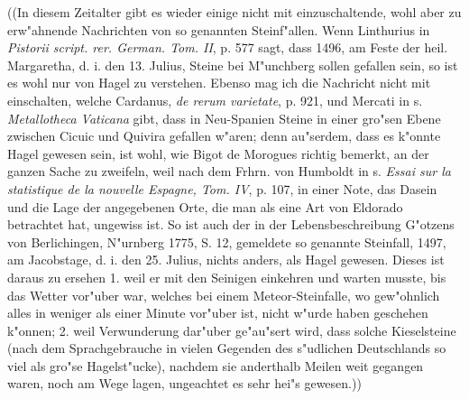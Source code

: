 \documentclass[a4paper, 11pt, oneside, polutonikogreek, german]{article}
\begin{document}
((In diesem Zeitalter gibt es wieder einige nicht mit einzuschaltende, wohl aber zu erw"ahnende Nachrichten von so genannten Steinf"allen. Wenn Linthurius in \emph{Pistorii script. rer. German. Tom. II}, p. 577 sagt, dass 1496, am Feste der heil. Margaretha, d. i. den 13. Julius, Steine bei M"unchberg sollen gefallen sein, so ist es wohl nur von Hagel zu verstehen. Ebenso mag ich die Nachricht nicht mit einschalten, welche Cardanus, \emph{de rerum varietate}, p. 921, und Mercati in s. \emph{Metallotheca Vaticana} gibt, dass in Neu-Spanien Steine in einer gro"sen Ebene zwischen Cicuic und Quivira gefallen w"aren; denn au"serdem, dass es k"onnte Hagel gewesen sein, ist wohl, wie Bigot de Morogues richtig bemerkt, an der ganzen Sache zu zweifeln, weil nach dem Frhrn. von Humboldt in s. \emph{Essai sur la statistique de la nouvelle Espagne, Tom. IV}, p. 107, in einer Note, das Dasein und die Lage der angegebenen Orte, die man als eine Art von Eldorado betrachtet hat, ungewiss ist. So ist auch der in der Lebensbeschreibung G"otzens von Berlichingen, N"urnberg 1775, S. 12, gemeldete so genannte Steinfall, 1497, am Jacobstage, d. i. den 25. Julius, nichts anders, als Hagel gewesen. Dieses ist daraus zu ersehen 1. weil er mit den Seinigen einkehren und warten musste, bis das Wetter vor"uber war, welches bei einem Meteor-Steinfalle, wo gew"ohnlich alles in weniger als einer Minute vor"uber ist, nicht w"urde haben geschehen k"onnen; 2. weil Verwunderung dar"uber ge"au"sert wird, dass solche Kieselsteine (nach dem Sprachgebrauche in vielen Gegenden des s"udlichen Deutschlands so viel als gro"se Hagelst"ucke), nachdem sie anderthalb Meilen weit gegangen waren, noch am Wege lagen, ungeachtet es sehr hei"s gewesen.))
\end{document}
